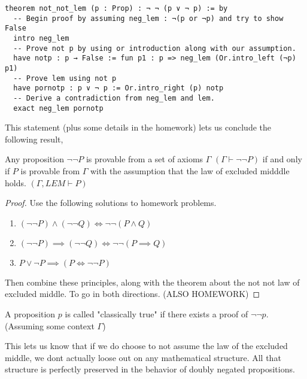 \begin{verbatim}
theorem not_not_lem (p : Prop) : ¬ ¬ (p ∨ ¬ p) := by
  -- Begin proof by assuming neg_lem : ¬(p or ¬p) and try to show False
  intro neg_lem 
  -- Prove not p by using or introduction along with our assumption.
  have notp : p → False := fun p1 : p => neg_lem (Or.intro_left (¬p) p1)
  -- Prove lem using not p
  have pornotp : p ∨ ¬ p := Or.intro_right (p) notp
  -- Derive a contradiction from neg_lem and lem.
  exact neg_lem pornotp
\end{verbatim}

This statement (plus some details in the homework) lets us conclude the following result,

\begin{theorem}
    Any proposition $\neg \neg P$ is provable from a set of axioms $\Gamma$  $(\Gamma \vdash \neg \neg P)$ if and only if $P$ is provable from $\Gamma$ with the assumption that the law of excluded midddle holds. $(\Gamma, LEM \vdash P)$
\end{theorem}
\begin{proof}
    Use the following solutions to homework problems.  
    \begin{enumerate}
        \item $(\neg \neg P) \land (\neg \neg Q) \iff  \neg \neg (P \land Q)$
        \item $(\neg \neg P) \implies (\neg \neg Q) \iff  \neg \neg (P \implies Q)$
        \item $P \lor \neg P \implies (P \iff \neg \neg P)$
    \end{enumerate}
    Then combine these principles, along with the theorem about the not not law of excluded middle. To go in both directions. (ALSO HOMEWORK)
\end{proof}
\begin{definition}
    A proposition $p$ is called "classically true" if there exists a proof of $\neg \neg p$. (Assuming some context $\Gamma$)
\end{definition}
This lets us know that if we do choose to not assume the law of the excluded middle, we dont actually loose out on any mathematical structure. All that structure is perfectly preserved in the behavior of doubly negated propositions. 


